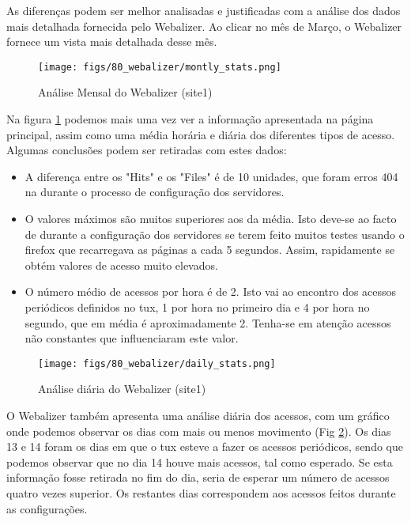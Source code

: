As diferenças podem ser melhor analisadas e justificadas com a análise dos dados mais detalhada fornecida pelo Webalizer. Ao clicar
no mês de Março, o Webalizer fornece um vista mais detalhada desse mês.

\begin{figure}
    \centering
    \texttt{[image: figs/80\_webalizer/montly\_stats.png]}
    \caption{Análise Mensal do Webalizer (site1)}
    \label{fig:monthly_webalizer}
\end{figure}

Na figura \ref{fig:monthly_webalizer} podemos mais uma vez ver a informação apresentada na página principal, assim como uma média horária e diária
dos diferentes tipos de acesso. Algumas conclusões podem ser retiradas com estes dados:
\begin{itemize}
    \item A diferença entre os "Hits" e os "Files" é de 10 unidades, que foram erros 404 na durante o processo de configuração dos servidores.
    \item O valores máximos são muitos superiores aos da média. Isto deve-se ao facto de durante a configuração dos servidores se terem feito muitos testes usando o firefox que recarregava as páginas a cada 5 segundos. Assim, rapidamente se obtém valores de acesso muito elevados.
    \item O número médio de acessos por hora é de 2. Isto vai ao encontro dos acessos periódicos definidos no tux, 1 por hora no primeiro dia e 4 por hora no segundo, que em média é aproximadamente 2. Tenha-se em atenção acessos não constantes que influenciaram este valor.
\end{itemize}

\begin{figure}
    \centering
    \texttt{[image: figs/80\_webalizer/daily\_stats.png]}
    \caption{Análise diária do Webalizer (site1)}
    \label{fig:daily_webalizer}
\end{figure}

O Webalizer também apresenta uma análise diária dos acessos, com um gráfico onde podemos observar os dias com mais ou menos movimento (Fig \ref{fig:daily_webalizer}).
Os dias 13 e 14 foram os dias em que o tux esteve a fazer os acessos periódicos, sendo que podemos observar que no dia 14 houve mais acessos, tal como esperado.
Se esta informação fosse retirada no fim do dia, seria de esperar um número de acessos quatro vezes superior.
Os restantes dias correspondem aos acessos feitos durante as configurações.


